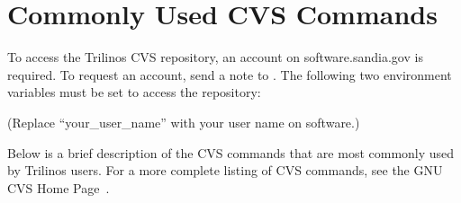 \documentclass[12pt,relax]{TrilinosUserGuide}
\begin{document}

\clearpage

%


\appendix
\section{Commonly Used CVS Commands}
\label{Section:CVS}
To access the Trilinos CVS repository, an account on software.sandia.gov is 
required.  To request an account, send a note to 
.  
The following two 
environment variables must be set to access the repository:


(Replace ``your\_user\_name'' with your user name on software.)

Below is a brief description of the CVS commands that are most commonly 
used by Trilinos users.  For a 
more complete listing of CVS commands, see the GNU CVS Home Page~\cite{CVS}.
\end{document}
